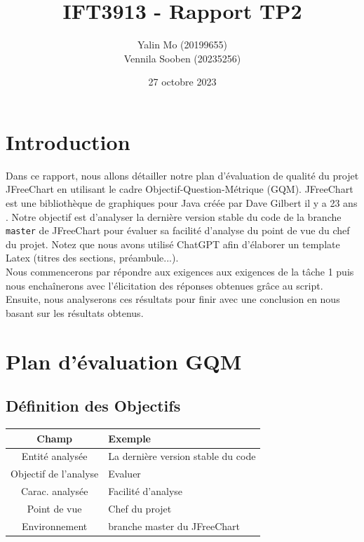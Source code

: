 \documentclass{proc}
\title{IFT3913 - Rapport TP2}
\author{Yalin Mo (20199655) \\ Vennila Sooben (20235256)}
\date{27 octobre 2023}
\begin{document}
\maketitle
\vspace{-7px}
\section{Introduction}
\vspace{-19px}
Dans ce rapport, nous allons détailler notre plan d'évaluation de qualité du projet JFreeChart en utilisant le cadre Objectif-Question-Métrique (GQM). JFreeChart est une bibliothèque de graphiques pour Java créée par Dave Gilbert il y a 23 ans \cite{jfreechart}. Notre objectif est d'analyser la dernière version stable du code de la branche \texttt{master} de JFreeChart pour évaluer sa facilité d'analyse du point de vue du chef du projet. Notez que nous avons utilisé ChatGPT \cite{openai2023} afin d'élaborer un template Latex (titres des sections, préambule...).
\\
Nous commencerons par répondre aux exigences aux exigences de la tâche 1 puis nous enchaînerons avec l'élicitation des réponses obtenues grâce au script. Ensuite, nous analyserons ces résultats pour finir avec une conclusion en nous basant sur les résultats obtenus.

\vspace{-51px}

\section{Plan d'évaluation GQM}
\vspace{-22.5px}
\subsection{Définition des Objectifs}

\begin{tabular}{|c|p{5cm}|}
\hline
\textbf{Champ} & \textbf{Exemple} \\
\hline
Entité analysée & La dernière version stable du code \\
\hline
Objectif de l'analyse & Evaluer \\
\hline
Carac. analysée & Facilité d’analyse  \\
\hline
Point de vue & Chef du projet \\
\hline
Environnement & branche master du JFreeChart \\
\hline
\end{tabular}
\end{document}
